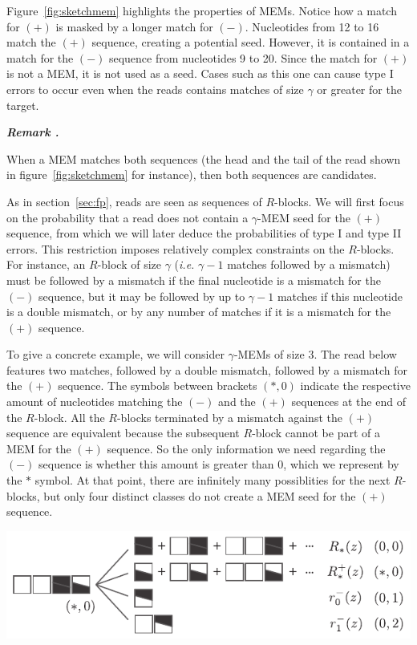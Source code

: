 \documentclass{article}
\newcounter{remarkcounter}
\newenvironment{remark}
{\small\it\vspace{0.5\baselineskip}
  \refstepcounter{remarkcounter}%
  \noindent\textbf{Remark \arabic{remarkcounter}.}%
}{\vspace{0.5\baselineskip}}
\newenvironment{inset}
{\vspace{0.5\baselineskip}\begin{center}}
{\end{center}\vspace{0.5\baselineskip}}
\begin{document}
Figure~\ref{fig:sketchmem} highlights the properties of MEMs. Notice how a
match for $(+)$ is masked by a longer match for $(-)$. Nucleotides from 12
to 16 match the $(+)$ sequence, creating a potential seed. However, it is
contained in a match for the $(-)$ sequence from nucleotides 9 to 20.
Since the match for $(+)$ is not a MEM, it is not used as a seed. Cases
such as this one can cause type I errors to occur even when the reads
contains matches of size $\gamma$ or greater for the target.

\begin{remark}
When a MEM matches both sequences (the head and the tail of the read shown
in figure~\ref{fig:sketchmem} for instance), then both sequences are
candidates.
\end{remark}


As in section~\ref{sec:fp}, reads are seen as sequences of $R$-blocks. We
will first focus on the probability that a read does not contain a
$\gamma$-MEM seed for the $(+)$ sequence, from which we will later deduce
the probabilities of type I and type II errors. This restriction imposes
relatively complex constraints on the $R$-blocks. For instance, an
$R$-block of size $\gamma$ (\textit{i.e.} $\gamma-1$ matches followed by a
mismatch) must be followed by a mismatch if the final nucleotide is a
mismatch for the $(-)$ sequence, but it may be followed by up to
$\gamma-1$ matches if this nucleotide is a double mismatch, or by any
number of matches if it is a mismatch for the $(+)$ sequence.


To give a concrete example, we will consider $\gamma$-MEMs of size $3$.
The read below features two matches, followed by a double mismatch,
followed by a mismatch for the $(+)$ sequence. The symbols between
brackets $(*,0)$ indicate the respective amount of nucleotides matching
the $(-)$ and the $(+)$ sequences at the end of the $R$-block. All the
$R$-blocks terminated by a mismatch against the $(+)$ sequence are
equivalent because the subsequent $R$-block cannot be part of a
MEM for the $(+)$ sequence. So the only information we need regarding the
$(-)$ sequence is whether this amount is greater than $0$, which we
represent by the $*$ symbol. At that point, there are infinitely many
possiblities for the next $R$-blocks, but only four distinct classes do
not create a MEM seed for the $(+)$ sequence.

\begin{inset}
\includegraphics[scale=0.9]{example_dual_mem.pdf}
\end{inset}
\end{document}

